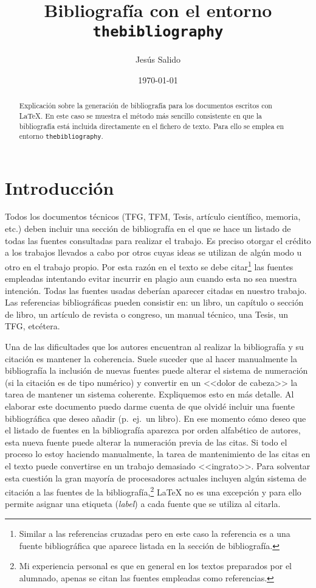 \documentclass[11pt,a4paper]{article}
\author{Jesús Salido}
\title{Bibliografía con el entorno \texttt{thebibliography}}
\date{\today}
\begin{document}
\maketitle


\begin{abstract}
	Explicación sobre la generación de bibliografía para los documentos escritos con \LaTeX{}. En este caso se muestra el método más sencillo consistente en que la bibliografía está incluida directamente en el fichero de texto. Para ello se emplea en entorno \texttt{thebibliography}.
\end{abstract}

\tableofcontents

\section{Introducción}
Todos los documentos técnicos (TFG, TFM, Tesis, artículo científico, memoria, etc.) deben incluir una sección de bibliografía en el que se hace un listado de todas las fuentes consultadas para realizar el trabajo. Es preciso otorgar el crédito a los trabajos llevados a cabo por otros cuyas ideas se utilizan de algún modo u otro en el trabajo propio. Por esta razón en el texto se debe citar\footnote{Similar a las referencias cruzadas pero en este caso la referencia es a una fuente bibliográfica que aparece listada en la sección de bibliografía.} las fuentes empleadas intentando evitar incurrir en plagio \cite{usbplagio2010} aun cuando esta no sea nuestra intención. Todas las fuentes usadas deberían aparecer citadas en nuestro trabajo. Las referencias bibliográficas pueden consistir en: un libro, un capítulo o sección de libro, un artículo de revista o congreso, un manual técnico, una Tesis, un TFG, etcétera.

Una de las dificultades que los autores encuentran al realizar la bibliografía y su citación es mantener la coherencia. Suele suceder que al hacer manualmente la bibliografía la inclusión de nuevas fuentes puede alterar el sistema de numeración (si la citación es de tipo numérico) y convertir en un <<dolor de cabeza>> la tarea de mantener un sistema coherente. Expliquemos esto en más detalle. Al elaborar este documento puedo darme cuenta de que olvidé incluir una fuente bibliográfica que deseo añadir (p.~ej.\ un libro). En ese momento cómo deseo que el listado de fuentes en la bibliografía aparezca por orden alfabético de autores, esta nueva fuente puede alterar la numeración previa de las citas. Si todo el proceso lo estoy haciendo manualmente, la tarea de mantenimiento de las citas en el texto puede convertirse en un trabajo demasiado <<ingrato>>. Para solventar esta cuestión la gran mayoría de procesadores actuales incluyen algún sistema de citación a las fuentes de la bibliografía,\footnote{Mi experiencia personal es que en general en los textos preparados por el alumnado, apenas se citan las fuentes empleadas como referencias.} \LaTeX{} no es una excepción y para ello permite asignar una etiqueta (\emph{label}) a cada fuente que se utiliza al citarla. 
\end{document}

